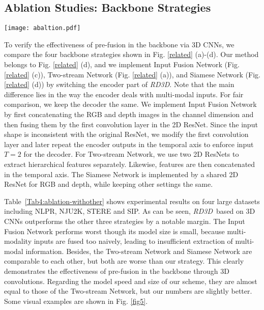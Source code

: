 \documentclass[letterpaper]{article}
\def\ourmodel{\emph{RD3D}}
\begin{document}
\vspace{-0.2cm}
\subsection{Ablation Studies: Backbone Strategies}
\begin{figure*}
	\centering
	\texttt{[image: abaltion.pdf]}
	\vspace{-0.35cm}
	\caption{\small Visual results for other architectures and ablation studies. In general, \ourmodel~provides the closest results to the GT.}\vspace{-0.3cm}
	\label{fig5}
\end{figure*}
To verify the effectiveness of pre-fusion in the backbone via 3D CNNs, we compare the four backbone strategies shown in Fig. \ref{related} (a)-(d). Our method belongs to Fig. \ref{related} (d), and we implement Input Fusion Network (Fig. \ref{related} (c)), Two-stream Network (Fig. \ref{related} (a)), and Siamese Network (Fig. \ref{related} (d)) by switching the encoder part of \ourmodel. Note that the main difference lies in the way the encoder deals with multi-modal inputs. For fair comparison, we keep the decoder the same.
We implement Input Fusion Network by first concatenating the RGB and depth images in the channel dimension and then fusing them by the first convolution layer in the 2D ResNet. Since the input shape is inconsistent with the original ResNet, we modify the first convolution layer and later repeat the encoder outputs in the temporal axis to enforce input $T=2$ for the decoder. For Two-stream Network, we use two 2D ResNets to extract hierarchical features separately. Likewise, features are then concatenated in the temporal axis. The Siamese Network is implemented by a shared 2D ResNet for RGB and depth, while keeping other settings the same.

Table~\ref{Tab4:ablation-withother} shows experimental results on four large datasets including NLPR, NJU2K, STERE and SIP.
As can be seen, \ourmodel~based on 3D CNNs outperforms the other three strategies by a notable margin. The Input Fusion Network performs worst though its model size is small, because multi-modality inputs are fused too naively, leading to insufficient extraction of multi-modal information. Besides, the Two-stream Network and Siamese Network are comparable to each other, but both are worse than our strategy. This clearly demonstrates the effectiveness of pre-fusion in the backbone through 3D convolutions. Regarding the model speed and size of our scheme, they are almost equal to those of the Two-stream Network, but our numbers are slightly better. Some visual examples are shown in Fig. \ref{fig5}.
\end{document}

